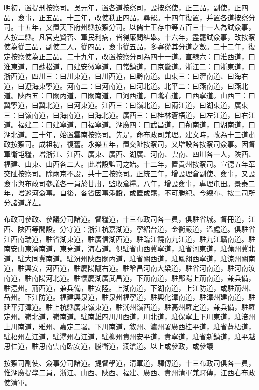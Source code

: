 明初，置提刑按察司。吳元年，置各道按察司，設按察使，正三品，副使，正四品，僉事，正五品。十三年，改使秩正四品，尋罷。十四年復置，并置各道按察分司。十五年，又置天下府州縣按察分司。以儒士王存中等五百三十一人為試僉事，人按二縣。凡官吏賢否、軍民利病，皆得廉問糾舉。十六年，盡罷試僉事，改按察使為從三品，副使二人，從四品，僉事從五品，多寡從其分道之數。二十二年，復定按察使為正三品。二十九年，改置按察分司為四十一道。直隸六：曰淮西道，曰淮東道，曰蘇松道，曰建安徽寧道，曰常鎮道，曰京畿道。浙江二：曰浙東道，曰浙西道，四川三：曰川東道，曰川西道，曰黔南道。山東三：曰濟南道、曰海右道，曰遼海東寧道。河南二：曰河南道，曰河北道。北平二：曰燕南道，曰燕北道。陜西五：曰關內道，曰關南道，曰河西道，曰隴右道，曰西寧道。山西三：曰冀寧道，曰冀北道，曰河東道。江西三：曰嶺北道，曰兩江道，曰湖東道，廣東三：曰嶺南道，曰海南道，曰海北道。廣西三：曰桂林蒼梧道，曰左江道，曰右江道。福建二：曰建寧道，曰福寧道。湖廣四：曰武昌道，曰荊南道，曰湖南道，曰湖北道。三十年，始置雲南按察司。先是，命布政司兼理。建文時，改為十三道肅政按察司。成祖初，復舊。永樂五年，置交阯按察司，又增設各按察司僉事。因督軍衛屯糧，增浙江、江西、廣東、廣西、湖廣、河南、雲南、四川各一人，陜西、福建、山東、山西各二人。此增設監司之始。十二年，置貴州按察司。宣德五年革交阯按察司。除兩京不設，共十三按察司。正統三年，增設理倉副使、僉事，又設僉事與布政司參議各一員於甘肅，監收倉糧。八年，增設僉事，專理屯田。景泰二年，增巡河僉事。自後，各省因事添設，或置或罷，不可勝紀。今總布、按二司所分諸道詳左。

布政司參政、參議分司諸道。督糧道，十三布政司各一員，俱駐省城。督冊道，江西、陜西等間設。分守道：浙江杭嘉湖道，寧紹台道，金衢嚴道，溫處道。俱駐省江西南瑞道，駐省湖東道，駐廣信湖西道，駐臨江饒南九江道，駐九江贛南道。駐南安山東濟南道，東兗道，海右道。俱駐省山西冀寧道，駐省河東道，駐蒲州冀北道，駐大同冀南道。駐汾州陜西關內道，駐省關西道，駐鳳翔西寧道，駐涼州關南道，駐興安，河西道，駐慶陽隴右道。駐鞏昌河南大梁道，駐省河南道，駐河南汝南道，駐南陽河北道。駐懷慶湖廣武昌道，下荊南道，駐鄖陽上荊南道，兼兵備，駐澧州。荊西道，兼兵備，駐安陸。上湖南道，下湖南道，上江防道，或駐荊州、岳州。下江防道。福建興泉道，駐泉州福寧道，駐興化漳南道，駐漳州建南道，駐延平汀漳道。駐上杭縣廣東嶺東道，駐潮州嶺西道，駐高州羅定道，兼兵備，駐羅定州。嶺北道，嶺南道。駐南雄四川川西道，川北道，駐保寧上下川東道，駐涪州上川南道，雅州、嘉定二署。下川南道，敘州、瀘州署廣西桂平道，駐省蒼梧道，駐梧州左江道，駐潯州右江道，駐柳州貴州安平道，貴寧道，駐省新鎮道，駐平越思仁道，駐思南雲南臨安道，騰衝道，瀾滄道。以上或參政，或參議

按察司副使、僉事分司諸道。提督學道，清軍道，驛傳道，十三布政司俱各一員，惟湖廣提學二員，浙江、山西、陜西、福建、廣西、貴州清軍兼驛傳，江西右布政使清軍。

